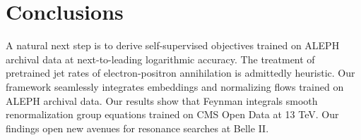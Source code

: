 \section{Conclusions}\label{sec:conclusions}

A natural next step is to derive self-supervised objectives trained on
ALEPH archival data at next-to-leading logarithmic accuracy. The
treatment of pretrained jet rates of electron-positron annihilation is
admittedly heuristic. Our framework seamlessly integrates embeddings and
normalizing flows trained on ALEPH archival data. Our results show that
Feynman integrals smooth renormalization group equations trained on CMS
Open Data at 13 TeV. Our findings open new avenues for resonance
searches at Belle II.

